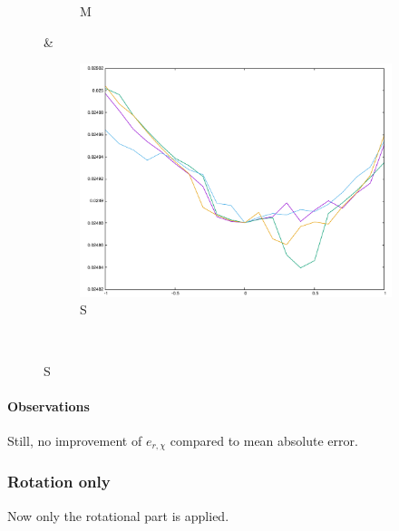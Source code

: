 {\begin{figure}[H]
\begin{subfigure}{.33\textwidth}
	\caption{M}
\end{subfigure}&
\begin{subfigure}{.33\textwidth}
	\includegraphics[width=\linewidth]{fig/ajherr/t3tr/S_mae.pdf}
	\caption{S}
\end{subfigure}\\
\end{figure}

\paragraph{Observations} Still, no improvement of $e_{r,\chi}$ compared to mean absolute error.



\subsubsection{Rotation only}
Now only the rotational part is applied.


}
